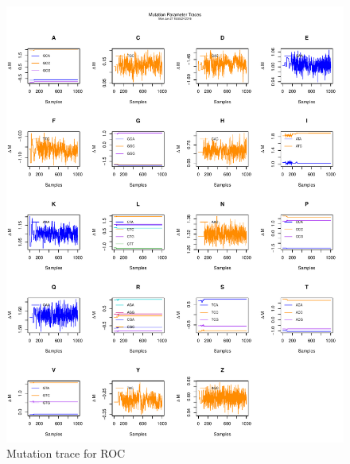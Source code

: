 \documentclass[11pt]{labbook}
\begin{document}
    \begin{figure}
        \centering
        \includegraphics[scale=.65]{FONSE_Plots/2016/June_27/ROC/Run1_MutationTrace}
        \caption{Mutation trace for ROC}
        \label{fig:JUN27_RMUT}
    \end{figure}
\end{document}

